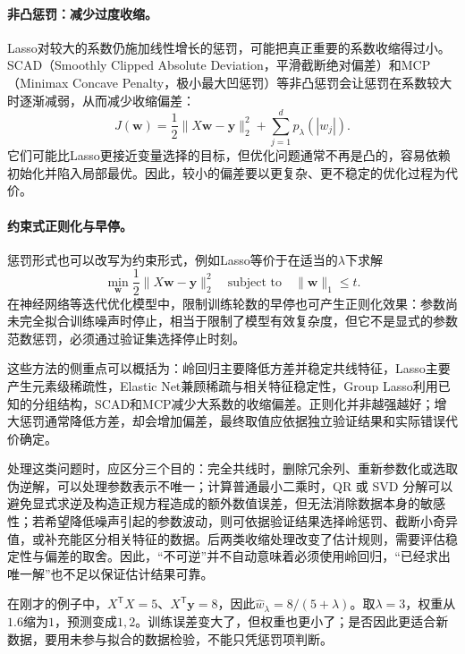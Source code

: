 \paragraph{非凸惩罚：减少过度收缩。}
Lasso对较大的系数仍施加线性增长的惩罚，可能把真正重要的系数收缩得过小。SCAD（Smoothly Clipped Absolute Deviation，平滑截断绝对偏差）和MCP（Minimax Concave Penalty，极小最大凹惩罚）等非凸惩罚会让惩罚在系数较大时逐渐减弱，从而减少收缩偏差：
\begin{equation}
 J(\bm w)=\frac12\|X\bm w-\bm y\|_2^2+\sum_{j=1}^d p_\lambda(|w_j|).
 \label{eq:linear-nonconvex-penalty}
\end{equation}
它们可能比Lasso更接近变量选择的目标，但优化问题通常不再是凸的，容易依赖初始化并陷入局部最优。因此，较小的偏差要以更复杂、更不稳定的优化过程为代价。

\paragraph{约束式正则化与早停。}
惩罚形式也可以改写为约束形式，例如Lasso等价于在适当的$\lambda$下求解
\begin{equation}
 \min_{\bm w}\frac12\|X\bm w-\bm y\|_2^2
 \quad\text{subject to}\quad \|\bm w\|_1\leq t.
 \end{equation}
在神经网络等迭代优化模型中，限制训练轮数的早停也可产生正则化效果：参数尚未完全拟合训练噪声时停止，相当于限制了模型有效复杂度，但它不是显式的参数范数惩罚，必须通过验证集选择停止时刻。

这些方法的侧重点可以概括为：岭回归主要降低方差并稳定共线特征，Lasso主要产生元素级稀疏性，Elastic Net兼顾稀疏与相关特征稳定性，Group Lasso利用已知的分组结构，SCAD和MCP减少大系数的收缩偏差。正则化并非越强越好；增大惩罚通常降低方差，却会增加偏差，最终取值应依据独立验证结果和实际错误代价确定。

处理这类问题时，应区分三个目的：完全共线时，删除冗余列、重新参数化或选取伪逆解，可以处理参数表示不唯一；计算普通最小二乘时，QR 或 SVD 分解可以避免显式求逆及构造正规方程造成的额外数值误差，但无法消除数据本身的敏感性；若希望降低噪声引起的参数波动，则可依据验证结果选择岭惩罚、截断小奇异值，或补充能区分相关特征的数据。后两类收缩处理改变了估计规则，需要评估稳定性与偏差的取舍。因此，“不可逆”并不自动意味着必须使用岭回归，“已经求出唯一解”也不足以保证估计结果可靠。

在刚才的例子中，$X^{\mathsf T}X=5$、$X^{\mathsf T}\bm y=8$，因此$\hat w_\lambda=8/(5+\lambda)$。取$\lambda=3$，权重从$1.6$缩为$1$，预测变成$1,2$。训练误差变大了，但权重也更小了；是否因此更适合新数据，要用未参与拟合的数据检验，不能只凭惩罚项判断。

